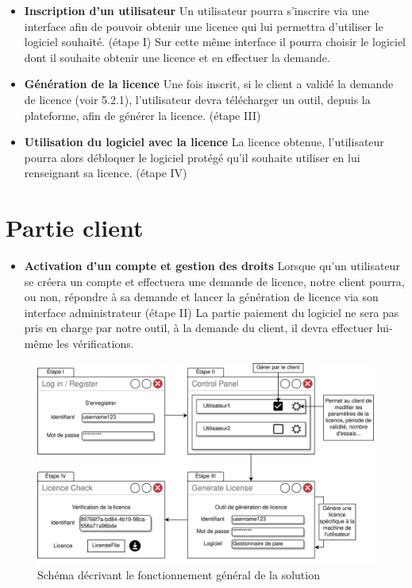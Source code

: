 \begin{itemize}
	\item \textbf{Inscription d'un utilisateur} \newline
	Un utilisateur pourra s'inscrire via une interface afin de pouvoir obtenir une licence qui lui permettra d'utiliser le logiciel souhaité. (étape I)
	Sur cette même interface il pourra choisir le logiciel dont il souhaite obtenir une licence et en effectuer la demande.
	\item \textbf{Génération de la licence} \newline
	Une fois inscrit, si le client a validé la demande de licence (voir 5.2.1), l'utilisateur devra télécharger un outil, depuis la plateforme, afin de générer la licence. (étape III)
	\item \textbf{Utilisation du logiciel avec la licence} \newline
	La licence obtenue, l'utilisateur pourra alors débloquer le logiciel protégé qu'il souhaite utiliser en lui renseignant sa licence. (étape IV)
\end{itemize}

\section{Partie client}

\begin{itemize}
	\item \textbf{Activation d'un compte et gestion des droits} \newline
	Lorsque qu'un utilisateur se créera un compte et effectuera une demande de licence, notre client pourra, ou non, 
	répondre à sa demande et lancer la génération de licence via son interface administrateur (étape II)
	\newline
	La partie paiement du logiciel ne sera pas pris en charge par notre outil, à la demande du client,
	il devra effectuer lui-même les vérifications.
\end{itemize}

\newpage

\begin{figure}[h]
	\centering
	\vspace{4cm}
	\includegraphics[width=18cm]{main/png/STB.png}
	\caption{Schéma décrivant le fonctionnement général de la solution}
	\label{fig:fig1}
\end{figure}


